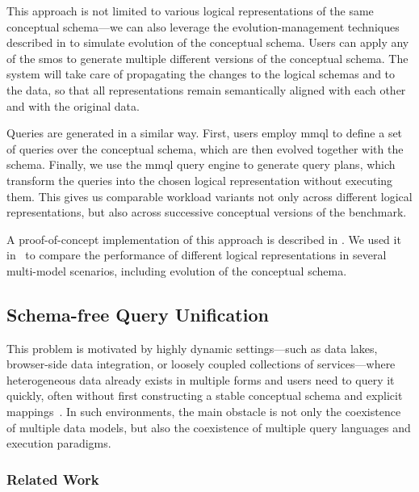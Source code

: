 This approach is not limited to various logical representations of the same conceptual schema---we can also leverage the evolution-management techniques described in  to simulate evolution of the conceptual schema. Users can apply any of the \acrshort{smo}s to generate multiple different versions of the conceptual schema. The system will take care of propagating the changes to the logical schemas and to the data, so that all representations remain semantically aligned with each other and with the original data.

Queries are generated in a similar way. First, users employ \acrshort{mmql} to define a set of queries over the conceptual schema, which are then evolved together with the schema. Finally, we use the \acrshort{mmql} query engine to generate query plans, which transform the queries into the chosen logical representation without executing them. This gives us comparable workload variants not only across different logical representations, but also across successive conceptual versions of the benchmark.

A proof-of-concept implementation of this approach is described in . We used it in~\citep{is_2026} to compare the performance of different logical representations in several multi-model scenarios, including evolution of the conceptual schema.


\subsection{Schema-free Query Unification}

This problem is motivated by highly dynamic settings---such as data lakes, browser-side data integration, or loosely coupled collections of services---where heterogeneous data already exists in multiple forms and users need to query it quickly, often without first constructing a stable conceptual schema and explicit mappings~\citep{CSUR-Jiaheng,AWSDataLake}. In such environments, the main obstacle is not only the coexistence of multiple data models, but also the coexistence of multiple query languages and execution paradigms.

\subsubsection{Related Work}


